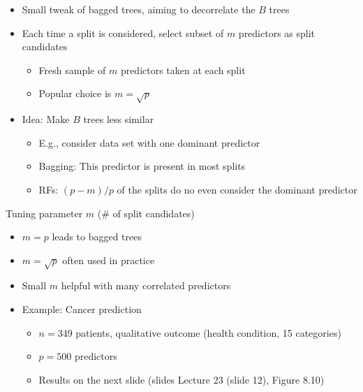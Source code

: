 \documentclass[11pt,a4paper,numbers=endperiod]{scrartcl}
\newcommand{\tit}[1]{\begin{large} \underline{\text{#1}}\end{large}}
\begin{document}
{\begin{itemize}
	\item Small tweak of bagged trees, aiming to decorrelate the $B$ trees
	\item Each time a split is considered, select subset of $m$ predictors as split candidates \begin{itemize}
		\item Fresh sample of $m$ predictors taken at each split
		\item Popular choice is $m = \sqrt{p}$
	\end{itemize}
	\item Idea: Make $B$ trees less similar \begin{itemize}
		\item E.g., consider data set with one dominant predictor
		\item Bagging: This predictor is present in most splits
		\item  RFs: $(p-m)/p$ of the splits do no even consider the dominant predictor
	\end{itemize}
\end{itemize}

Tuning parameter $m$ (\# of split candidates) \begin{itemize}
	\item $m = p$ leads to bagged trees
	\item $m = \sqrt{p}$ often used in practice
	\item Small $m$ helpful with many correlated predictors
	\item Example: Cancer prediction \begin{itemize}
		\item $n = 349$ patients, qualitative outcome (health condition, 15 categories)
		\item $p = 500$ predictors
		\item Results on the next slide (slides Lecture 23 (slide 12), Figure 8.10)  
	\end{itemize}
\end{itemize}

\tit{Boosting}\\

}
\end{document}
